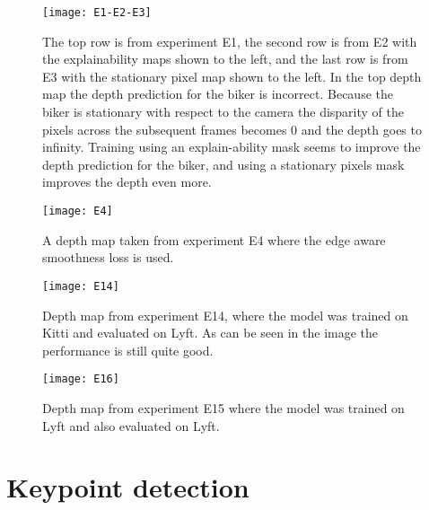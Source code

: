 \begin{figure}[H]
	\centering
	\texttt{[image: E1-E2-E3]}
	\caption{The top row is from experiment E1, the second row is from E2 with the explainability maps shown to the left, and the last row is from E3 with the stationary pixel map shown to the left. In the top depth map the depth prediction for the biker is incorrect. Because the biker is stationary with respect to the camera the disparity of the pixels across the subsequent frames becomes 0 and the depth goes to infinity. Training using an explain-ability mask seems to improve the depth prediction for the biker, and using a stationary pixels mask improves the depth even more.}
	\label{fig:e1e2e3}
\end{figure}

\begin{figure}[H]
	\centering
	\texttt{[image: E4]}
	\caption{A depth map taken from experiment E4 where the edge aware smoothness loss is used.}
	\label{fig:E4}
\end{figure}

\begin{figure}[H]
	\centering
	\texttt{[image: E14]}
	\caption{Depth map from experiment E14, where the model was trained on Kitti and evaluated on Lyft. As can be seen in the image the performance is still quite good.}
	\label{fig:E14}
\end{figure}

\begin{figure}[H]
	\centering
	\texttt{[image: E16]}
	\caption{Depth map from experiment E15 where the model was trained on Lyft and also evaluated on Lyft.}
	\label{fig:E16}
\end{figure}

\iffalse
\begin{figure}[H]
	\centering
	\texttt{[image: evaluation]}
	\caption{Evaluation metrics when testing the configurations on the testing split of the datasets}
	\label{fig:evaluation}
\end{figure}

\begin{figure}[H]
	\centering
	\texttt{[image: depthmapslyft]}
	\caption{Examples from the Lyft dataset}
	\label{fig:depthmaplyft}
\end{figure}
\fi


\section{Keypoint detection}

